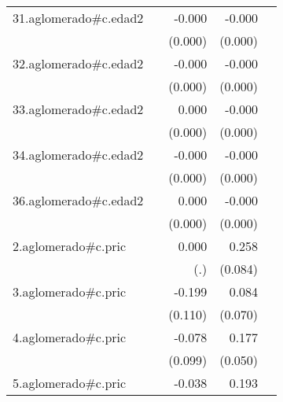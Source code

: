 {\begin{longtable}{l*{4}{D{.}{.}{-1}}}
\addlinespace
31.aglomerado#c.edad2&                     &      -0.000         &      -0.000\sym{***}&                     \\
            &                     &     (0.000)         &     (0.000)         &                     \\
\addlinespace
32.aglomerado#c.edad2&                     &      -0.000         &      -0.000\sym{***}&                     \\
            &                     &     (0.000)         &     (0.000)         &                     \\
\addlinespace
33.aglomerado#c.edad2&                     &       0.000         &      -0.000\sym{**} &                     \\
            &                     &     (0.000)         &     (0.000)         &                     \\
\addlinespace
34.aglomerado#c.edad2&                     &      -0.000         &      -0.000\sym{***}&                     \\
            &                     &     (0.000)         &     (0.000)         &                     \\
\addlinespace
36.aglomerado#c.edad2&                     &       0.000         &      -0.000         &                     \\
            &                     &     (0.000)         &     (0.000)         &                     \\
\addlinespace
2.aglomerado#c.pric&                     &       0.000         &       0.258\sym{**} &                     \\
            &                     &         (.)         &     (0.084)         &                     \\
\addlinespace
3.aglomerado#c.pric&                     &      -0.199         &       0.084         &                     \\
            &                     &     (0.110)         &     (0.070)         &                     \\
\addlinespace
4.aglomerado#c.pric&                     &      -0.078         &       0.177\sym{***}&                     \\
            &                     &     (0.099)         &     (0.050)         &                     \\
\addlinespace
5.aglomerado#c.pric&                     &      -0.038         &       0.193\sym{**} &                     \\

\end{longtable}}
